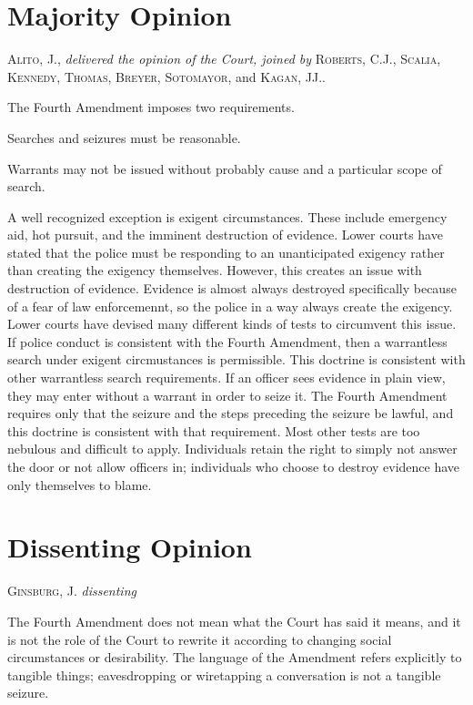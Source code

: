 \documentclass[paper=letter,fontsize=10pt]{article}
\begin{document}
\section{Majority Opinion}
	\textsc{Alito, J.}, \textit{delivered the opinion of the Court, joined by} \textsc{Roberts, C.J.}, \textsc{Scalia, Kennedy, Thomas, Breyer, Sotomayor,} and \textsc{Kagan, JJ.}. \par
		The Fourth Amendment imposes two requirements. 
		\begin{enumerate*} \item Searches and seizures must be reasonable. \item Warrants may not be issued without probably cause and a particular scope of search. \end{enumerate*}
		A well recognized exception is exigent circumstances.
		These include emergency aid, hot pursuit, and the imminent destruction of evidence.
		Lower courts have stated that the police must be responding to an unanticipated exigency rather than creating the exigency themselves.
		However, this creates an issue with destruction of evidence.
		Evidence is almost always destroyed specifically because of a fear of law enforcemennt, so the police in a way always create the exigency.
		Lower courts have devised many different kinds of tests to circumvent this issue.
		If police conduct is consistent with the Fourth Amendment, then a warrantless search under exigent circmustances is permissible.
		This doctrine is consistent with other warrantless search requirements.
		If an officer sees evidence in plain view, they may enter without a warrant in order to seize it.
		The Fourth Amendment requires only that the seizure and the steps preceding the seizure be lawful, and this doctrine is consistent with that requirement.
		Most other tests are too nebulous and difficult to apply. 
		Individuals retain the right to simply not answer the door or not allow officers in; individuals who choose to destroy evidence have only themselves to blame.
\section{Dissenting Opinion}
	\noindent \textsc{Ginsburg, J.} \textit{dissenting}\par
		The Fourth Amendment does not mean what the Court has said it means, and it is not the role of the Court to rewrite it according to changing social circumstances or desirability. The language of the Amendment refers explicitly to tangible things; eavesdropping or wiretapping a conversation is not a tangible seizure.
\end{document}
